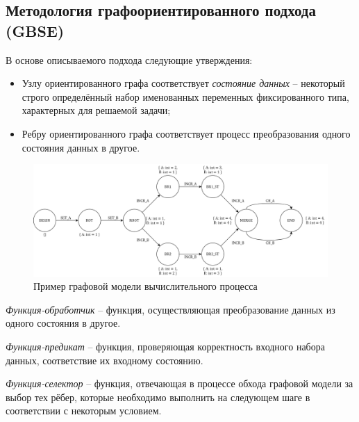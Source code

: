 \subsection{Методология графоориентированного подхода (GBSE)}
\begin{frame}
  В основе описываемого подхода следующие утверждения:
  \begin{itemize}
    \item Узлу ориентированного графа соответствует \emph{состояние данных} -- некоторый строго определённый набор именованных переменных фиксированного типа, характерных для решаемой задачи;
    \item Ребру ориентированного графа соответствует процесс преобразования одного состояния данных в другое.
  \end{itemize}

  \begin{figure}
    \centering
    \includegraphics[width=\textwidth]{images/adot_example.png}
    \caption{Пример графовой модели вычислительного процесса}\label{fig:aDotExamplePic}
  \end{figure}
\end{frame}

\begin{frame}
  \begin{designation}
    \emph{Функция-обработчик} -- функция, осуществляющая преобразование данных из одного состояния в другое.    
  \end{designation}
  \begin{designation}
    \emph{Функция-предикат} -- функция, проверяющая корректность входного набора данных, соответствие их входному состоянию.
  \end{designation}
  \begin{designation}
    \emph{Функция-селектор} -- функция, отвечающая в процессе обхода графовой модели за выбор тех рёбер, которые необходимо выполнить на следующем шаге в соответствии с некоторым условием.    
  \end{designation}
\end{frame}

